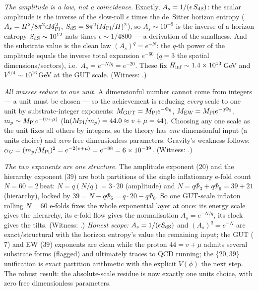\documentclass[11pt]{article}
\begin{document}
\emph{The amplitude is a law, not a coincidence.} Exactly, $A_s=1/(\epsilon\,S_{\rm dS})$:
the scalar amplitude is the inverse of the slow-roll $\epsilon$ times the de~Sitter horizon
entropy ($A_s=H^2/8\pi^2\epsilon M_{\rm Pl}^2$, $S_{\rm dS}=8\pi^2(M_{\rm Pl}/H)^2$), so
$A_s\sim10^{-9}$ is the inverse of a horizon entropy $S_{\rm dS}\sim10^{12}$ nats times
$\epsilon\sim1/4800$ --- a derivation of the smallness. And the substrate value is the
clean law $(A_s)^q=e^{-N}$: the $q$-th power of the amplitude equals the inverse total
expansion $e^{-60}$ ($q=3$ the spatial dimensions/sectors), i.e.\ $A_s=e^{-N/q}=e^{-20}$.
These fix $H_{\rm inf}\sim1.4\times10^{13}$\,GeV and $V^{1/4}\sim10^{16}$\,GeV at the GUT
scale. (Witness: .)

\emph{All masses reduce to one unit.} A dimensionful number cannot come from integers --- a
unit must be chosen --- so the achievement is reducing \emph{every} scale to one unit by
substrate-integer exponents: $M_{\rm GUT}=M_{\rm Pl}e^{-\Phi_6}$, $M_{\rm EW}=M_{\rm Pl}
e^{-q\Phi_3}$, $m_p\sim M_{\rm Pl}e^{-(v+\mu)}$ ($\ln(M_{\rm Pl}/m_p)=44.0\approx v+\mu=44$).
Choosing any one scale as the unit fixes all others by integers, so the theory has
\emph{one} dimensionful input (a units choice) and \emph{zero} free dimensionless
parameters. Gravity's weakness follows: $\alpha_G=(m_p/M_{\rm Pl})^2=e^{-2(v+\mu)}=e^{-88}=
6\times10^{-39}$. (Witness: .)

\emph{The two exponents are one structure.} The amplitude exponent ($20$) and the
hierarchy exponent ($39$) are both partitions of the single inflationary e-fold count
$N=60=2\,\mathrm{beat}$: $N=q(N/q)=3\cdot20$ (amplitude) and $N=q\Phi_3+q\Phi_6=39+21$
(hierarchy), locked by $39=N-q\Phi_6=q\cdot20-q\Phi_6$. So one GUT-scale inflaton rolling
$N=60$ e-folds fixes the whole exponential layer at once: its energy scale gives the
hierarchy, its e-fold flow gives the normalisation $A_s=e^{-N/q}$, its clock gives the
tilts. (Witness: .) \emph{Honest scope:}
$A_s=1/(\epsilon S_{\rm dS})$ and $(A_s)^q=e^{-N}$ are exact/structural with the horizon
entropy's value the remaining input; the GUT ($7$) and EW ($39$) exponents are clean while
the proton $44=v+\mu$ admits several substrate forms (flagged) and ultimately traces to QCD
running; the $\{20,39\}$ unification is exact partition arithmetic with the explicit
$V(\phi)$ the next step. The robust result: the absolute-scale residue is now exactly one
units choice, with zero free dimensionless parameters.
\end{document}
